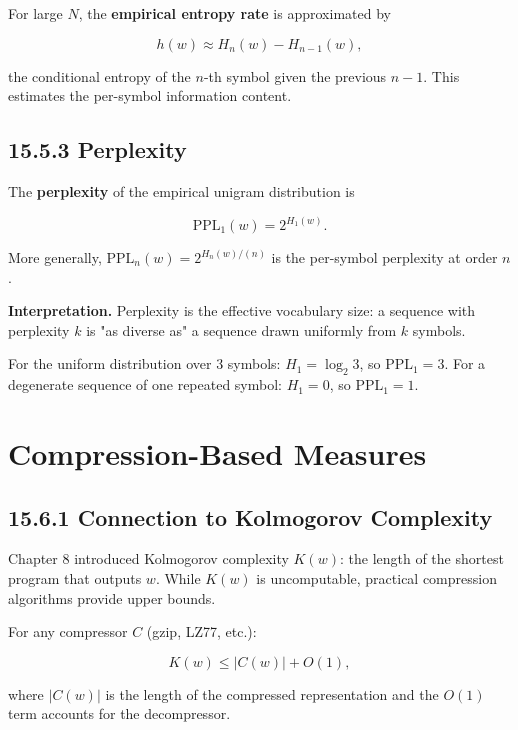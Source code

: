 \begin{proposition}
For large $N$, the \textbf{empirical entropy rate} is approximated by

\[h(w) \approx H_n(w) - H_{n-1}(w),\]

the conditional entropy of the $n$-th symbol given the previous $n-1$. This estimates the per-symbol information content.
\end{proposition}

\subsection{15.5.3 Perplexity}

\begin{definition}
The \textbf{perplexity} of the empirical unigram distribution is

\[\mathrm{PPL}_1(w) = 2^{H_1(w)}.\]

More generally, $\mathrm{PPL}_n(w) = 2^{H_n(w)/(n)}$ is the per-symbol perplexity at order $n$.

\textbf{Interpretation.} Perplexity is the effective vocabulary size: a sequence with perplexity $k$ is "as diverse as" a sequence drawn uniformly from $k$ symbols.
\end{definition}

\begin{example}
For the uniform distribution over 3 symbols: $H_1 = \log_2 3$, so $\mathrm{PPL}_1 = 3$. For a degenerate sequence of one repeated symbol: $H_1 = 0$, so $\mathrm{PPL}_1 = 1$.
\end{example}



\section{Compression-Based Measures}

\subsection{15.6.1 Connection to Kolmogorov Complexity}

Chapter 8 introduced Kolmogorov complexity $K(w)$: the length of the shortest program that outputs $w$. While $K(w)$ is uncomputable, practical compression algorithms provide upper bounds.

\begin{proposition}
For any compressor $C$ (gzip, LZ77, etc.):

\[K(w) \leq |C(w)| + O(1),\]

where $|C(w)|$ is the length of the compressed representation and the $O(1)$ term accounts for the decompressor.
\end{proposition}

